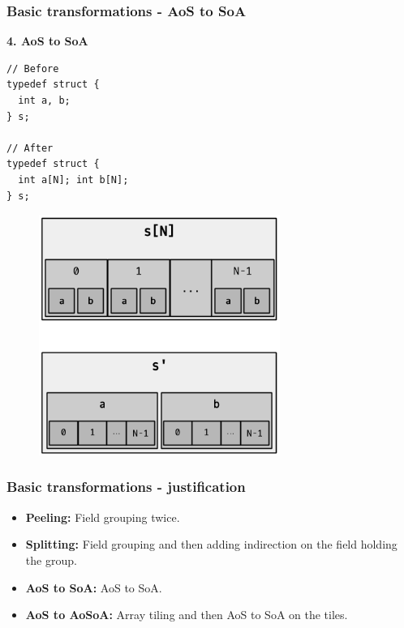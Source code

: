 \begin{frame}[fragile]
\frametitle{Basic transformations - AoS to SoA}

\begin{center}
\begin{minipage}{0.3\linewidth}
\textbf{\small 4. AoS to SoA}
\begin{lstlisting}[style=Cstyle, basicstyle=\scriptsize]
// Before
typedef struct {
  int a, b;
} s;

// After
typedef struct {
  int a[N]; int b[N];
} s;
\end{lstlisting}
\end{minipage}%
\begin{minipage}{0.5\linewidth}
\begin{figure}
	\centering
	\includegraphics[width=0.7\textwidth]{images/soa}
\end{figure}
\end{minipage}
\end{center}

\end{frame}


\begin{frame}[fragile]
\frametitle{Basic transformations - justification}

\begin{itemize}
	\setlength\itemsep{1.5em}
	\item \textbf{Peeling:} Field grouping twice.
	\item \textbf{Splitting:} Field grouping and then adding indirection on the field holding the group.
	\item \textbf{AoS to SoA:} AoS to SoA.
	\item \textbf{AoS to AoSoA:} Array tiling and then AoS to SoA on the tiles.
\end{itemize}

\end{frame}


